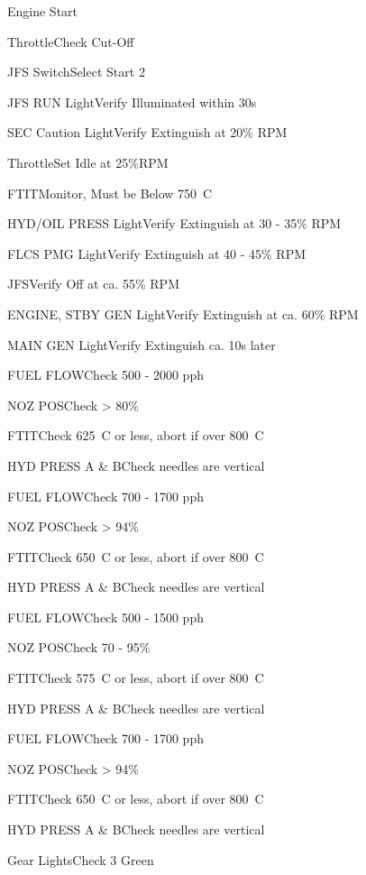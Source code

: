 \documentclass[sim-use]{checklist}
\begin{document}
\begin{checklist}{Engine Start}
	\item{Throttle}{Check Cut-Off}
	\item{JFS Switch}{Select Start 2}
	\item{JFS RUN Light}{Verify Illuminated within 30s}
	\item{SEC Caution Light}{Verify Extinguish at 20\% RPM}
	\item{Throttle}{Set Idle at 25\%RPM}
	\item{FTIT}{Monitor, Must be Below 750\degree\ C}
	\item{HYD/OIL PRESS Light}{Verify Extinguish at 30 - 35\% RPM}
	\item{FLCS PMG Light}{Verify Extinguish at 40 - 45\% RPM}
	\item{JFS}{Verify Off at ca. 55\% RPM}
	\item{ENGINE, STBY GEN Light}{Verify Extinguish at ca. 60\% RPM}
	\item{MAIN GEN Light}{Verify Extinguish ca. 10s later}
	 {
		\item{FUEL FLOW}{Check 500 - 2000 pph}
		\item{NOZ POS}{Check > 80\%}
		\item{FTIT}{Check 625\degree\ C or less, abort if over 800\degree\ C}
		\item{HYD PRESS A \& B}{Check needles are vertical}
	}
	 {
		\item{FUEL FLOW}{Check 700 - 1700 pph}
		\item{NOZ POS}{Check > 94\%}
		\item{FTIT}{Check 650\degree\ C or less, abort if over 800\degree\ C}
		\item{HYD PRESS A \& B}{Check needles are vertical}
	}
	 {
		\item{FUEL FLOW}{Check 500 - 1500 pph}
		\item{NOZ POS}{Check 70 - 95\%}
		\item{FTIT}{Check 575\degree\ C or less, abort if over 800\degree\ C}
		\item{HYD PRESS A \& B}{Check needles are vertical}
	}
	 {
		\item{FUEL FLOW}{Check 700 - 1700 pph}
		\item{NOZ POS}{Check > 94\%}
		\item{FTIT}{Check 650\degree\ C or less, abort if over 800\degree\ C}
		\item{HYD PRESS A \& B}{Check needles are vertical}
	}
	\item{Gear Lights}{Check 3 Green}
\end{checklist}
\end{document}

